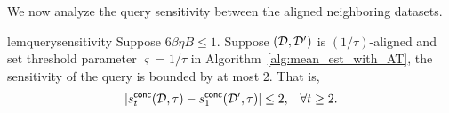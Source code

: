 
    

We now analyze the query sensitivity between the aligned neighboring  
datasets.

\begin{restatable}{lem}{querysensitivity}
    \label{lm:query_sensitivity}
Suppose $6\beta\eta B\le1$.
Suppose $(\mathcal{D},\mathcal{D}')$ is $(1/\tau)$-aligned and set threshold parameter $\varsigma=1/\tau$ in Algorithm~\ref{alg:mean_est_with_AT}, the sensitivity of the query is bounded by at most $2$.
That is,
\begin{align*}
    |s^{\mathsf{conc}}_t(\mathcal{D},\tau)-s^{\mathsf{conc}}_1(\mathcal{D}',\tau)|\le 2, & & \forall t\ge 2.
\end{align*}
\end{restatable}



